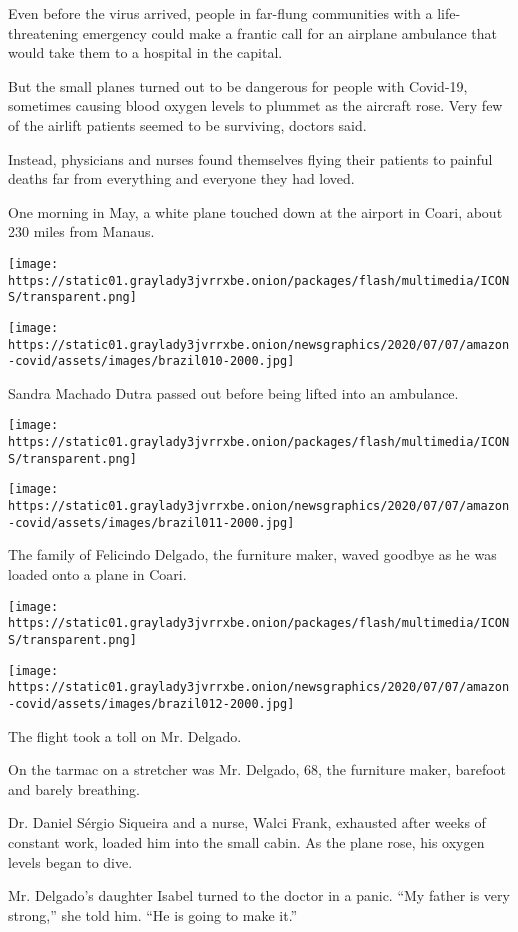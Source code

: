 Even before the virus arrived, people in far-flung communities with a
life-threatening emergency could make a frantic call for an airplane
ambulance that would take them to a hospital in the capital.

But the small planes turned out to be dangerous for people with
Covid-19, sometimes causing blood oxygen levels to plummet as the
aircraft rose. Very few of the airlift patients seemed to be surviving,
doctors said.

Instead, physicians and nurses found themselves flying their patients to
painful deaths far from everything and everyone they had loved.

One morning in May, a white plane touched down at the airport in Coari,
about 230 miles from Manaus.

\texttt{[image: https://static01.graylady3jvrrxbe.onion/packages/flash/multimedia/ICONS/transparent.png]}

\texttt{[image: https://static01.graylady3jvrrxbe.onion/newsgraphics/2020/07/07/amazon-covid/assets/images/brazil010-2000.jpg]}

Sandra Machado Dutra passed out before being lifted into an ambulance.

\texttt{[image: https://static01.graylady3jvrrxbe.onion/packages/flash/multimedia/ICONS/transparent.png]}

\texttt{[image: https://static01.graylady3jvrrxbe.onion/newsgraphics/2020/07/07/amazon-covid/assets/images/brazil011-2000.jpg]}

The family of Felicindo Delgado, the furniture maker, waved goodbye as
he was loaded onto a plane in Coari.

\texttt{[image: https://static01.graylady3jvrrxbe.onion/packages/flash/multimedia/ICONS/transparent.png]}

\texttt{[image: https://static01.graylady3jvrrxbe.onion/newsgraphics/2020/07/07/amazon-covid/assets/images/brazil012-2000.jpg]}

The flight took a toll on Mr. Delgado.

On the tarmac on a stretcher was Mr. Delgado, 68, the furniture maker,
barefoot and barely breathing.

Dr. Daniel Sérgio Siqueira and a nurse, Walci Frank, exhausted after
weeks of constant work, loaded him into the small cabin. As the plane
rose, his oxygen levels began to dive.

Mr. Delgado's daughter Isabel turned to the doctor in a panic. ``My
father is very strong,'' she told him. ``He is going to make it.''

